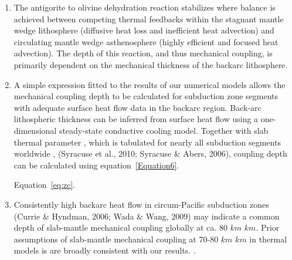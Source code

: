 \documentclass[draft,linenumbers]{agujournal2018} %
\providecommand{\DIFaddtex}[1]{{\protect\color{blue} \sf #1}} %
\providecommand{\DIFdeltex}[1]{{\protect\color{red} \scriptsize #1}} %
\providecommand{\DIFaddbegin}{} %
\providecommand{\DIFaddend}{} %
\providecommand{\DIFdelbegin}{} %
\providecommand{\DIFdelend}{} %
\providecommand{\DIFadd}[1]{\texorpdfstring{\DIFaddtex{#1}}{#1}} %
\providecommand{\DIFdel}[1]{\texorpdfstring{\DIFdeltex{#1}}{}} %
\newcommand{\DIFscaledelfig}{0.3}
\newlength{\DIFdelgraphicswidth} %
\newlength{\DIFdelgraphicsheight} %
\newcommand{\DIFaddincludegraphics}[2][]{{\color{blue}\fbox{\DIFOincludegraphics[#1]{#2}}}} %
\newcommand{\DIFdelincludegraphics}[2][]{%
\sbox{\DIFdelgraphicsbox}{\DIFOincludegraphics[#1]{#2}}%
\settoboxwidth{\DIFdelgraphicswidth}{\DIFdelgraphicsbox} %
\settoboxtotalheight{\DIFdelgraphicsheight}{\DIFdelgraphicsbox} %
\scalebox{\DIFscaledelfig}{%
\parbox[b]{\DIFdelgraphicswidth}{\usebox{\DIFdelgraphicsbox}\\[-\baselineskip] \rule{\DIFdelgraphicswidth}{0em}}\llap{\resizebox{\DIFdelgraphicswidth}{\DIFdelgraphicsheight}{%
\setlength{\unitlength}{\DIFdelgraphicswidth}%
\begin{picture}(1,1)%
\thicklines\linethickness{2pt} %
{\color[rgb]{1,0,0}\put(0,0){\framebox(1,1){}}}%
{\color[rgb]{1,0,0}\put(0,0){\line( 1,1){1}}}%
{\color[rgb]{1,0,0}\put(0,1){\line(1,-1){1}}}%
\end{picture}%
}\hspace*{3pt}}} %
} %
\DeclareRobustCommand{\DIFaddbegin}{\DIFOaddbegin \let\includegraphics\DIFaddincludegraphics} %
\DeclareRobustCommand{\DIFaddend}{\DIFOaddend \let\includegraphics\DIFOincludegraphics} %
\DeclareRobustCommand{\DIFdelbegin}{\DIFOdelbegin \let\includegraphics\DIFdelincludegraphics} %
\DeclareRobustCommand{\DIFdelend}{\DIFOaddend \let\includegraphics\DIFOincludegraphics} %
\begin{document}
\begin{enumerate}
\DIFaddbegin \def\labelenumi{\arabic{enumi}.}
\DIFaddend \item
  The antigorite to olivine dehydration reaction stabilizes where
  balance is achieved between competing thermal feedbacks within the
  stagnant mantle wedge lithosphere (diffusive heat loss and inefficient
  heat advection) and circulating mantle wedge asthenosphere (highly
  efficient and focused heat advection). The depth of this reaction, and
  thus mechanical coupling, is primarily dependent on the mechanical
  thickness of the backarc lithosphere.
\DIFdelbegin %

\DIFdelend \item
  A simple expression fitted to the results of our numerical models
  allows the mechanical coupling depth to be calculated for subduction
  zone segments with adequate surface heat flow data in the backarc
  region. Back-arc lithospheric thickness can be inferred from surface
  heat flow using a one-dimensional steady-state conductive cooling
  model. Together with slab thermal parameter , which is tabulated for
  nearly all subduction segments worldwide \DIFdelbegin %
\DIFdel{, }\DIFdelend \DIFaddbegin \DIFadd{(Syracuse et al., 2010;
  Syracuse \& Abers, 2006), }\DIFaddend coupling depth can be calculated using
  \DIFdelbegin \DIFdel{equation~\ref{Equation6}.
}%

\DIFdelend \DIFaddbegin \DIFadd{Equation~\ref{eq:zc}.
}\DIFaddend \item
  Consistently high backarc heat flow in circum-Pacific subduction zones
  \DIFdelbegin %
\DIFdelend \DIFaddbegin \DIFadd{(Currie \& Hyndman, 2006; Wada \& Wang, 2009) }\DIFaddend may indicate a common
  depth of slab-mantle mechanical coupling globally at ca. 80 \DIFdelbegin \DIFdel{$km$}\DIFdelend \DIFaddbegin \DIFadd{\(km\)}\DIFaddend .
  Prior assumptions of slab-mantle mechanical coupling at 70-80 \DIFdelbegin \DIFdel{$km$ }\DIFdelend \DIFaddbegin \DIFadd{\(km\)
  }\DIFaddend in thermal models \DIFdelbegin \DIFdel{is }\DIFdelend \DIFaddbegin \DIFadd{are broadly }\DIFaddend consistent with our results.
\DIFdelbegin \DIFdel{.
}%


\end{enumerate}
\end{document}
